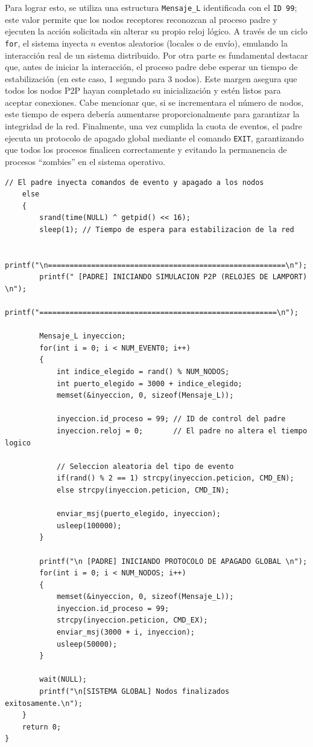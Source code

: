 Para lograr esto, se utiliza una estructura \texttt{Mensaje\_L} identificada con el \texttt{ID 99}; este valor permite que los nodos receptores reconozcan al proceso padre y ejecuten la acción solicitada sin alterar su propio reloj lógico. A través de un ciclo \texttt{for}, el sistema inyecta $n$ eventos aleatorios (locales o de envío), emulando la interacción real de un sistema distribuido. Por otra parte es fundamental destacar que, antes de iniciar la interacción, el proceso padre debe esperar un tiempo de estabilización (en este caso, 1 segundo para 3 nodos). Este margen asegura que todos los nodos P2P hayan completado su inicialización y estén listos para aceptar conexiones. Cabe mencionar que, si se incrementara el número de nodos, este tiempo de espera debería aumentarse proporcionalmente para garantizar la integridad de la red. Finalmente, una vez cumplida la cuota de eventos, el padre ejecuta un protocolo de apagado global mediante el comando \texttt{EXIT}, garantizando que todos los procesos finalicen correctamente y evitando la permanencia de procesos ``zombies'' en el sistema operativo.
\begin{lstlisting}[style=estiloC]
    // El padre inyecta comandos de evento y apagado a los nodos
    else
    {
        srand(time(NULL) ^ getpid() << 16);
        sleep(1); // Tiempo de espera para estabilizacion de la red
        
        printf("\n=======================================================\n");
        printf(" [PADRE] INICIANDO SIMULACION P2P (RELOJES DE LAMPORT) \n");
        printf("=======================================================\n");

        Mensaje_L inyeccion;
        for(int i = 0; i < NUM_EVENT0; i++) 
        {
            int indice_elegido = rand() % NUM_NODOS;
            int puerto_elegido = 3000 + indice_elegido;
            memset(&inyeccion, 0, sizeof(Mensaje_L));
            
            inyeccion.id_proceso = 99; // ID de control del padre
            inyeccion.reloj = 0;       // El padre no altera el tiempo logico
            
            // Seleccion aleatoria del tipo de evento
            if(rand() % 2 == 1) strcpy(inyeccion.peticion, CMD_EN);
            else strcpy(inyeccion.peticion, CMD_IN); 

            enviar_msj(puerto_elegido, inyeccion);
            usleep(100000);
        }

        printf("\n [PADRE] INICIANDO PROTOCOLO DE APAGADO GLOBAL \n");
        for(int i = 0; i < NUM_NODOS; i++) 
        {
            memset(&inyeccion, 0, sizeof(Mensaje_L));
            inyeccion.id_proceso = 99; 
            strcpy(inyeccion.peticion, CMD_EX); 
            enviar_msj(3000 + i, inyeccion);
            usleep(50000); 
        }

        wait(NULL); 
        printf("\n[SISTEMA GLOBAL] Nodos finalizados exitosamente.\n");
    }
    return 0;
}
\end{lstlisting}


